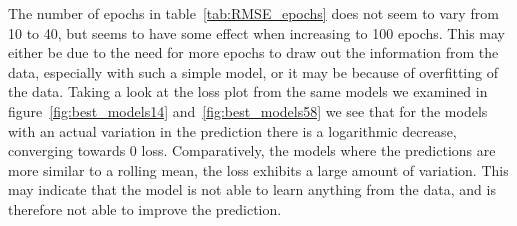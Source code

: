 The number of epochs in table~\ref{tab:RMSE_epochs} does not seem to vary from 10 to 40, but seems to have some effect when increasing to 100 epochs. This may either be due to the need for more epochs to draw out the information from the data, especially with such a simple model, or it may be because of overfitting of the data. Taking a look at the loss plot from the same models we examined in figure~\ref{fig:best_models14} and~\ref{fig:best_models58} we see that for the models with an actual variation in the prediction there is a logarithmic decrease, converging towards 0 loss. Comparatively, the models where the predictions are more similar to a rolling mean, the loss exhibits a large amount of variation. This may indicate that the model is not able to learn anything from the data, and is therefore not able to improve the prediction. 

